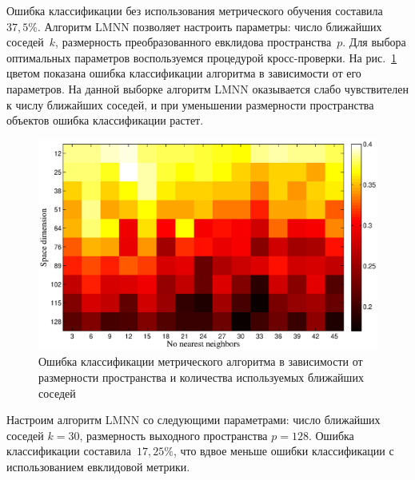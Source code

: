 	Ошибка классификации без использования метрического обучения составила~$37,5\%$.
	Алгоритм LMNN позволяет настроить параметры: число ближайших соседей~$k$,
	размерность преобразованного евклидова пространства~$p$.
	Для выбора оптимальных параметров воспользуемся процедурой кросс-проверки.
	На рис.~\ref{heat_map} цветом показана ошибка классификации алгоритма в зависимости от его параметров.
	На данной выборке алгоритм LMNN оказывается слабо чувствителен к числу ближайших соседей,
	и при уменьшении размерности пространства объектов ошибка классификации растет.
	\begin{figure}[ht]
		\centering
		\includegraphics[width=1\linewidth]{figs/ch4/heat_map}
		\caption{Ошибка классификации метрического алгоритма в зависимости от размерности пространства и количества используемых ближайших соседей}
		\label{heat_map}
	\end{figure}
	
	Настроим алгоритм LMNN со следующими параметрами: число ближайших соседей $k = 30$, размерность
	выходного пространства $p = 128$.
	Ошибка классификации составила~$17,25\%$, что вдвое меньше ошибки классификации с использованием евклидовой метрики.
	
